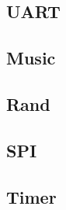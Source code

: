 {%
\subsection{UART}





\subsection{Music}





\subsection{Rand}





\subsection{SPI}





\subsection{Timer}

}
